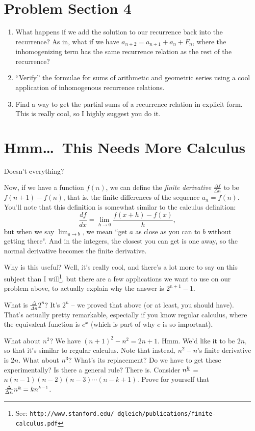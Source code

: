 \documentclass[12pt,letterpaper]{article}
\begin{document}
\section{Problem Section 4}
\begin{enumerate}
\item What happens if we add the solution to our recurrence back into the
recurrence? As in, what if we have $a_{n+2} = a_{n+1} + a_n + F_n$, where the
inhomogenizing term has the same recurrence relation as the rest of the recurrence?
\item ``Verify'' the formulae for sums of arithmetic and geometric series using
a cool application of inhomogenous recurrence relations.
\item Find a way to get the partial sums of a recurrence relation in explicit
form. This is really cool, so I highly suggest you do it.
\end{enumerate}

\section{Hmm\dots\ This Needs More Calculus}
Doesn't everything?

Now, if we have a function $f(n)$, we can define the \emph{finite
derivative} $\frac{\Delta f}{\Delta n}$ to be $f(n+1)-f(n)$, that is,
the finite differences of the sequence $a_n = f(n)$. You'll note that
this definition is somewhat similar to the calculus definition:
$$\frac{df}{dx} = \lim_{h\to0}\frac{f(x+h) - f(x)}{h},$$ but when
we say $\lim_{a\to b}$, we mean ``get $a$ as close as you can to $b$
without getting there''. And in the integers, the closest you can get
is one away, so the normal derivative becomes the finite
derivative.

Why is this useful? Well, it's really cool, and there's a lot more to
say on this subject than I will\footnote{See:
\texttt{http://www.stanford.edu/\string~dgleich/publications/finite-calculus.pdf}},
but there are a few applications we want to use on our problem above,
to actually explain why the answer is $2^{n+1}-1$.

What is $\frac{\Delta}{\Delta n} 2^n$? It's $2^n$ -- we proved that above
(or at least, you should have). That's actually pretty remarkable,
especially if you know regular calculus, where the equivalent function
is $e^x$ (which is part of why $e$ is so important).

What about $n^2$? We have $(n+1)^2 - n^2 = 2n + 1$. Hmm. We'd like it to be
$2n$, so that it's similar to regular calculus. Note that instead,
$n^2 - n$'s finite derivative is $2n$. What
about $n^3$? What's its replacement? Do we have to get these
experimentally? Is there a general rule? There is. Consider
$n^{\uline k}$ = $n (n-1) (n-2) (n-3) \cdots (n-k+1)$. Prove for
yourself that $\frac{\Delta}{\Delta n} n^{\uline k} = k n^{k-1}$.
\end{document}
